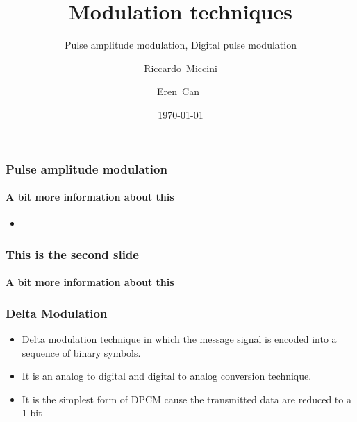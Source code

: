 \documentclass{beamer}
\title{Modulation techniques}
\subtitle{Pulse amplitude modulation, Digital pulse modulation}
\author[Riccardo \and Eren]{Riccardo~Miccini\inst{1} \and Eren~Can~\inst{1}}
\institute[DTU]
{
	\inst{1}
	Technical University of Denmark\\
	Digital Communication
}
\date{\today}
\begin{document}
	\frame{\titlepage}

	\begin{frame}
		\frametitle{Pulse amplitude modulation}
		\framesubtitle{A bit more information about this}
		\begin{itemize}
			\item
		\end{itemize}
	\end{frame}

	\begin{frame}
		\frametitle{This is the second slide}
		\framesubtitle{A bit more information about this}
	\end{frame}
	\begin{frame}
	\frametitle{Delta Modulation}
	\begin{itemize}
	\item Delta modulation technique in which the message signal is encoded into a sequence of binary symbols.
	\item It is an analog to digital and digital to analog conversion technique.
	\item  It is the simplest form of DPCM cause the transmitted data are reduced to  a 1-bit
	\end{itemize}
	\end{frame}
	
\end{document}
